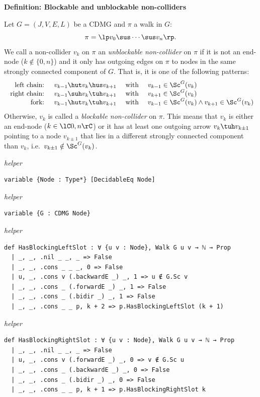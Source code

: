 \noindent\textbf{Definition: Blockable and unblockable non-colliders}\par\smallskip
{\appendixTexSize
\label{def:unblockable_noncollider}
  Let $G=(J,V,E,L)$ be a CDMG and $\pi$ a walk in $G$:
  \[ \pi =\lp  v_0 \sus \cdots \sus v_n \rp.  \]
  We call a non-collider $v_k$ on $\pi$ an \emph{unblockable non-collider} on $\pi$ if it is not an end-node ($k \notin \{0,n\}$) and it only has outgoing edges on $\pi$ to nodes in the same strongly connected component of $G$. That is,
  it is one of the following patterns:
  \[\begin{array}{rccl}
    \text{ left chain: } & v_{k-1} \hut v_k \hus v_{k+1} & \text{ with } & v_{k-1} \in \Sc^G(v_{k})\\
    \text{ right chain: } & v_{k-1} \suh v_k \tuh v_{k+1} & \text{ with } & v_{k+1} \in \Sc^G(v_{k})\\
    \text{ fork: } & v_{k-1} \hut v_k \tuh v_{k+1} & \text{ with } & v_{k-1} \in \Sc^G(v_k) \land v_{k+1} \in \Sc^G(v_k)
  \end{array}\]
  Otherwise, $v_k$ is called a \emph{blockable non-collider} on $\pi$.
  This means that $v_k$ is either an end-node ($k \in \lC 0,n\rC$) or it has at least one outgoing arrow 
  $v_k \tuh v_{k\pm1}$ pointing to a node $v_{k\pm1}$ that lies in a different strongly connected component than $v_k$, i.e.\ $v_{k\pm1} \notin \Sc^G(v_k)$.
\par}
\smallskip
{\small\textit{helper}}
\begin{verbatim}
variable {Node : Type*} [DecidableEq Node]
\end{verbatim}
{\small\textit{helper}}
\begin{verbatim}
variable {G : CDMG Node}
\end{verbatim}
{\small\textit{helper}}
\begin{verbatim}
def HasBlockingLeftSlot : ∀ {u v : Node}, Walk G u v → ℕ → Prop
  | _, _, .nil _ _, _ => False
  | _, _, .cons _ _ _, 0 => False
  | u, _, .cons v (.backwardE _) _, 1 => u ∉ G.Sc v
  | _, _, .cons _ (.forwardE _) _, 1 => False
  | _, _, .cons _ (.bidir _) _, 1 => False
  | _, _, .cons _ _ p, k + 2 => p.HasBlockingLeftSlot (k + 1)
\end{verbatim}
{\small\textit{helper}}
\begin{verbatim}
def HasBlockingRightSlot : ∀ {u v : Node}, Walk G u v → ℕ → Prop
  | _, _, .nil _ _, _ => False
  | u, _, .cons v (.forwardE _) _, 0 => v ∉ G.Sc u
  | _, _, .cons _ (.backwardE _) _, 0 => False
  | _, _, .cons _ (.bidir _) _, 0 => False
  | _, _, .cons _ _ p, k + 1 => p.HasBlockingRightSlot k
\end{verbatim}

